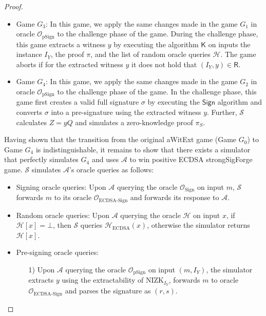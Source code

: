 \documentclass{llncs}
\begin{document}
\begin{proof}
\begin{itemize}
\item Game $G_3$: In this game, we apply the same changes made in the game $G_1$ in oracle $\mathcal{O}_{\text{pSign}}$ to the challenge phase of the game. During the challenge phase, this game extracts a witness $y$ by executing the algorithm $\mathsf{K}$ on inputs the instance $I_Y$, the proof $\pi$, and the list of random oracle queries $\mathcal{H}$. The game aborts if for the extracted witness $y$ it does not hold that $(I_Y,y) \in \mathsf{R}$.

\item Game $G_4$: In this game, we apply the same changes made in the game $G_2$ in oracle $\mathcal{O}_{\text{pSign}}$ to the challenge phase of the game. In the challenge phase, this game first creates a valid full signature $\sigma$ by executing the $\mathsf{Sign}$ algorithm and converts $\sigma$ into a pre-signature using the extracted witness $y$. Further, $\mathcal{S}$ calculates $Z=yQ$ and simulates a zero-knowledge proof $\pi_S$. 
\end{itemize}

Having shown that the transition from the original aWitExt game (Game $G_0$) to Game $G_4$ is indistinguishable, it remains to show that there exists a simulator that perfectly simulates $G_4$ and uses $\mathcal{A}$ to win positive ECDSA strongSigForge game. $\mathcal{S}$ simulates $\mathcal{A}$'s oracle queries as follows:

\begin{itemize}
\item Signing oracle queries: Upon $\mathcal{A}$ querying the oracle $\mathcal{O}_{\text{Sign}}$ on input $m$, $\mathcal{S}$ forwards $m$ to its oracle $\mathcal{O}_{\text{ECDSA-Sign}}$ and forwards its response to $\mathcal{A}$.

\item Random oracle queries: Upon $\mathcal{A}$ querying the oracle $\mathcal{H}$ on input $x$, if $\mathcal{H}[x] = \bot$, then $\mathcal{S}$ queries $\mathcal{H}_{\text{ECDSA}}(x)$, otherwise the simulator returns $\mathcal{H}[x]$.

\item Pre-signing oracle queries: 

\begin{itemize}
\item[1)] Upon $\mathcal{A}$ querying the oracle $\mathcal{O}_{\text{pSign}}$ on input $(m, I_Y)$, the simulator extracts $y$ using the extractability of NIZK$_{I_Y}$, forwards $m$ to oracle $\mathcal{O}_{\text{ECDSA-Sign}}$ and parses the signature as $(r, s)$.


\end{itemize}
\end{itemize}
\end{proof}
\end{document}

